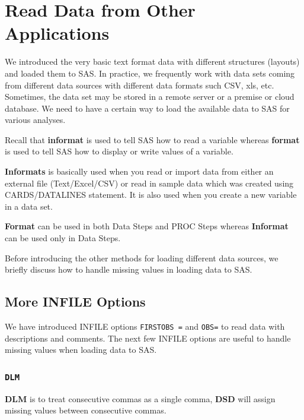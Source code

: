 \documentclass[
]{book}
\begin{document}
\hypertarget{read-data-from-other-applications}{%
\chapter{Read Data from Other Applications}\label{read-data-from-other-applications}}

We introduced the very basic text format data with different structures (layouts) and loaded them to SAS. In practice, we frequently work with data sets coming from different data sources with different data formats such CSV, xls, etc. Sometimes, the data set may be stored in a remote server or a premise or cloud database. We need to have a certain way to load the available data to SAS for various analyses.

Recall that \textbf{informat} is used to tell SAS how to read a variable whereas \textbf{format} is used to tell SAS how to display or write values of a variable.

\textbf{Informats} is basically used when you read or import data from either an external file (Text/Excel/CSV) or read in sample data which was created using CARDS/DATALINES statement. It is also used when you create a new variable in a data set.

\textbf{Format} can be used in both Data Steps and PROC Steps whereas \textbf{Informat} can be used only in Data Steps.

Before introducing the other methods for loading different data sources, we briefly discuss how to handle missing values in loading data to SAS.

\hypertarget{more-infile-options}{%
\section{More INFILE Options}\label{more-infile-options}}

We have introduced INFILE options \texttt{FIRSTOBS\ =} and \texttt{OBS=} to read data with descriptions and comments. The next few INFILE options are useful to handle missing values when loading data to SAS.

\hypertarget{dlm}{%
\subsection{\texorpdfstring{\texttt{DLM}}{DLM}}\label{dlm}}

\textbf{DLM} is to treat consecutive commas as a single comma, \textbf{DSD} will assign missing values between consecutive commas.
\end{document}
